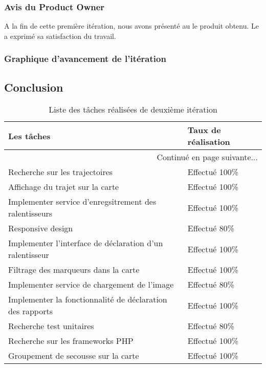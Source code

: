 \subsubsection{Avis du Product Owner}

A la fin de cette première itération, nous avons présenté au  le produit obtenu. Le  a exprimé sa
satisfaction du travail.

\subsubsection{Graphique d'avancement de l'itération}


\subsection{Conclusion}
\begin{center}
    \begin{longtable}{| l | l |}
        \caption{Liste des tâches réalisées de deuxième itération }
        \label{tab:sprint2-estimation} \\

        \hline
        \textbf{Les tâches} & \textbf{Taux de réalisation} \\ \hline
        \endhead

        \hline \multicolumn{2}{|r|}{{Continué en page suivante$\dotsc$}} \\ \hline
        \endfoot

        \hline \hline
        \endlastfoot

        \hline
Recherche sur les trajectoires & Effectué 100\% \\ \hline
Affichage du trajet sur la carte & Effectué 100\% \\ \hline
Implementer service d’enregsitrement des ralentisseurs & Effectué 100\% \\ \hline
Responsive design & Effectué 80\% \\ \hline
Implementer l’interface de déclaration d'un ralentisseur & Effectué 100\% \\ \hline
Filtrage des marqueurs dans la carte & Effectué 100\% \\ \hline
Implementer service de chargement de l'image & Effectué 80\% \\ \hline
Implementer la fonctionnalité de déclaration des rapports & Effectué 100\% \\ \hline
Recherche test unitaires & Effectué 80\% \\ \hline
Recherche sur les frameworks PHP & Effectué 100\% \\ \hline
Groupement de secousse sur la carte & Effectué 100\% \\ \hline
    \end{longtable}
\end{center}
